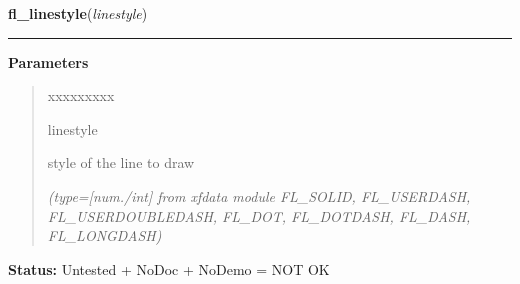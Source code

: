     \label{xformslib:library:fl_linestyle}

    \vspace{0.5ex}

\hspace{.8\funcindent}\begin{boxedminipage}{\funcwidth}

    \raggedright \textbf{fl\_linestyle}(\textit{linestyle})

    \vspace{-1.5ex}

    \rule{\textwidth}{0.5\fboxrule}
\setlength{\parskip}{2ex}
\setlength{\parskip}{1ex}
      \textbf{Parameters}
      \vspace{-1ex}

      \begin{quote}
        \begin{Ventry}{xxxxxxxxx}

          \item[linestyle]

          style of the line to draw

            {\it (type=[num./int] from xfdata module FL\_SOLID, FL\_USERDASH, FL\_USERDOUBLEDASH, 
FL\_DOT, FL\_DOTDASH, FL\_DASH, FL\_LONGDASH)}

        \end{Ventry}

      \end{quote}

\textbf{Status:} Untested + NoDoc + NoDemo = NOT OK



    \end{boxedminipage}

    \label{xformslib:library:fl_linestyle}

    \vspace{0.5ex}


